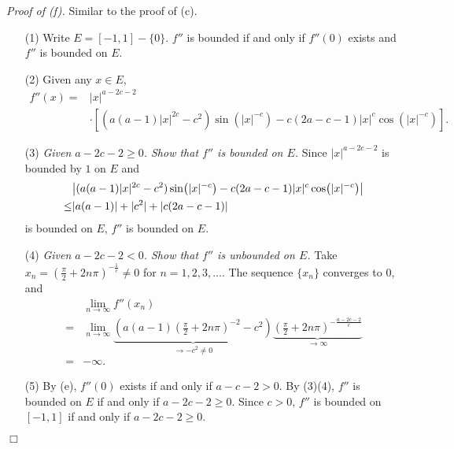 \documentclass{article}
\begin{document}
\emph{Proof of (f).}
Similar to the proof of (c).
\begin{enumerate}
  \item[(1)]
  Write $E = [-1,1] - \{0\}$.
  $f''$ is bounded if and only if $f''(0)$ exists and $f''$ is bounded on $E$.

  \item[(2)]
  Given any $x \in E$,
  \begin{align*}
    f''(x)
    =& |x|^{a-2c-2} \\
      &\cdot \left[
        ( a(a-1)|x|^{2c} - c^2 ) \sin(|x|^{-c})
        - c(2a-c-1)|x|^c\cos(|x|^{-c})
      \right].
  \end{align*}

  \item[(3)]
  \emph{Given $a-2c-2 \geq 0$.
  Show that $f''$ is bounded on $E$.}
  Since $|x|^{a-2c-2}$ is bounded by $1$ on $E$ and
  \begin{align*}
    &\abs{( a(a-1)|x|^{2c} - c^2 ) \sin(|x|^{-c}) - c(2a-c-1)|x|^c\cos(|x|^{-c})} \\
    \leq&
    |a(a-1)| + |c^2| + |c(2a-c-1)|
  \end{align*}
  is bounded on $E$, $f''$ is bounded on $E$.

  \item[(4)]
  \emph{Given $a-2c-2 < 0$.
  Show that $f''$ is unbounded on $E$.}
  Take
  $x_n = \left( \frac{\pi}{2} + 2n\pi \right)^{-\frac{1}{c}} \neq 0$
  for $n = 1, 2, 3, \ldots$.
  The sequence $\{ x_n \}$ converges to $0$, and
  \begin{align*}
    &\lim_{n \to \infty} f''(x_n) \\
    =& \lim_{n \to \infty}
      \underbrace{\left( a(a-1)
        \left( \frac{\pi}{2} + 2n\pi \right)^{-2} - c^2 \right)}_{\to -c^2 \neq 0}
      \underbrace{\left( \frac{\pi}{2} + 2n\pi \right)^{-\frac{a-2c-2}{c}}}_{\to \infty} \\
    =& - \infty.
  \end{align*}

  \item[(5)]
  By (e), $f''(0)$ exists if and only if $a - c - 2 > 0$.
  By (3)(4), $f''$ is bounded on $E$ if and only if $a - 2c - 2 \geq 0$.
  Since $c > 0$, $f''$ is bounded on $[-1,1]$ if and only if $a-2c-2 \geq 0$.
\end{enumerate}
$\Box$ \\
\end{document}
